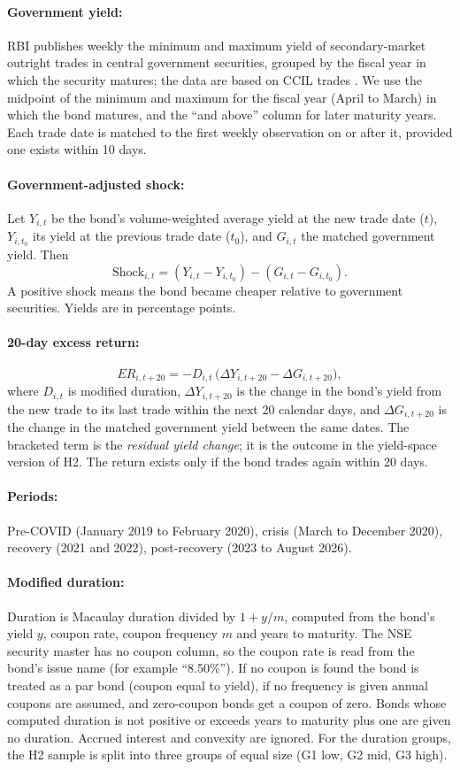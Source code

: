 \documentclass[a4paper,11pt]{article}
\begin{document}
\paragraph{Government yield:} RBI publishes weekly the minimum and maximum yield of secondary-market outright trades in central government securities, grouped by the fiscal year in which the security matures; the data are based on CCIL trades \cite{rbidbie}. We use the midpoint of the minimum and maximum for the fiscal year (April to March) in which the bond matures, and the ``and above'' column for later maturity years. Each trade date is matched to the first weekly observation on or after it, provided one exists within 10 days.

\paragraph{Government-adjusted shock:} Let $Y_{i,t}$ be the bond's volume-weighted average yield at the new trade date ($t$), $Y_{i,t_0}$ its yield at the previous trade date ($t_0$), and $G_{i,t}$ the matched government yield. Then
\[
\text{Shock}_{i,t} = (Y_{i,t}-Y_{i,t_0}) - (G_{i,t}-G_{i,t_0}).
\]
A positive shock means the bond became cheaper relative to government securities. Yields are in percentage points.

\paragraph{20-day excess return:}
\[
ER_{i,t+20} = -D_{i,t}\,\bigl(\Delta Y_{i,t+20}-\Delta G_{i,t+20}\bigr),
\]
where $D_{i,t}$ is modified duration, $\Delta Y_{i,t+20}$ is the change in the bond's yield from the new trade to its last trade within the next 20 calendar days, and $\Delta G_{i,t+20}$ is the change in the matched government yield between the same dates. The bracketed term is the \emph{residual yield change}; it is the outcome in the yield-space version of H2. The return exists only if the bond trades again within 20 days.

\paragraph{Periods:} Pre-COVID (January 2019 to February 2020), crisis (March to December 2020), recovery (2021 and 2022), post-recovery (2023 to August 2026).

\paragraph{Modified duration:} Duration is Macaulay duration divided by $1+y/m$, computed from the bond's yield $y$, coupon rate, coupon frequency $m$ and years to maturity. The NSE security master has no coupon column, so the coupon rate is read from the bond's issue name (for example ``8.50\%''). If no coupon is found the bond is treated as a par bond (coupon equal to yield), if no frequency is given annual coupons are assumed, and zero-coupon bonds get a coupon of zero. Bonds whose computed duration is not positive or exceeds years to maturity plus one are given no duration. Accrued interest and convexity are ignored. For the duration groups, the H2 sample is split into three groups of equal size (G1 low, G2 mid, G3 high).
\end{document}

